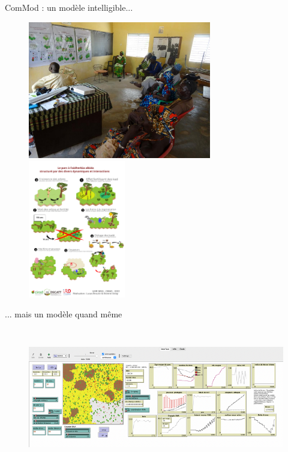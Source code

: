 \documentclass[aspectratio=169]{beamer}
\begin{document}
\begin{frame}{ComMod : un modèle intelligible...}
    \begin{center}
        \vspace{-1em}
        \begin{figure}
            \centering
            \includegraphics[height = 6cm]{img/atelierPoster.jpg}~
            \includegraphics[height = 6cm]{img/poster2.png}
        \end{figure}
    \end{center}
\end{frame}

\begin{frame}{... mais un modèle quand même}
    \begin{center}
        \vspace{-1em}
        \begin{figure}
            \centering
            \includegraphics[height = 6cm]{img/ideModele.png}
        \end{figure}
    \end{center}
\end{frame}
\end{document}
